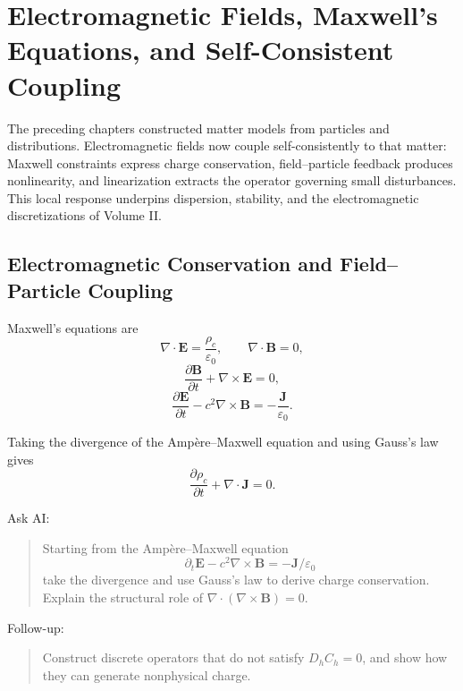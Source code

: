\chapter{Electromagnetic Fields, Maxwell's Equations, and Self-Consistent Coupling}\label{ch:3}

\begin{chaptersummary}
The preceding chapters constructed matter models from particles and distributions. Electromagnetic fields now couple self-consistently to that matter: Maxwell constraints express charge conservation, field--particle feedback produces nonlinearity, and linearization extracts the operator governing small disturbances. This local response underpins dispersion, stability, and the electromagnetic discretizations of Volume II.
\end{chaptersummary}

\section{Electromagnetic Conservation and Field--Particle Coupling}
Maxwell's equations are
\[
\nabla\cdot\bm E=\frac{\rho_c}{\varepsilon_0},
\qquad
\nabla\cdot\bm B=0,
\]
\[
\frac{\partial\bm B}{\partial t}+\nabla\times\bm E=0,
\]
\[
\frac{\partial\bm E}{\partial t}
-c^2\nabla\times\bm B
=
-\frac{\bm J}{\varepsilon_0}.
\]

Taking the divergence of the Amp\`ere--Maxwell equation and using Gauss's law gives
\[
\frac{\partial\rho_c}{\partial t}
+\nabla\cdot\bm J=0.
\]

\begin{askai}
Ask AI:
\begin{quote}
Starting from the Amp\`ere--Maxwell equation
\[
\partial_t\bm E-c^2\nabla\times\bm B=-\bm J/\varepsilon_0
\]
take the divergence and use Gauss's law to derive charge conservation. Explain the structural role of \(\nabla\cdot(\nabla\times\bm B)=0\).
\end{quote}

Follow-up:
\begin{quote}
Construct discrete operators that do not satisfy \(D_hC_h=0\), and show how they can generate nonphysical charge.
\end{quote}
\end{askai}

